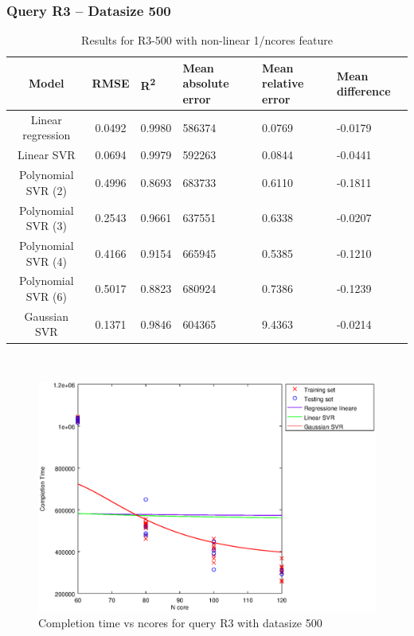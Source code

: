 \documentclass[a4paper,11pt]{article}
\begin{document}
\newpage
\subsubsection{Query R3 -- Datasize 500}
\begin{table}[H]
	\centering
	\begin{adjustbox}{center}
		\begin{tabular}{c | c M{1.2cm} M{2.5cm} M{2.5cm} M{1.8cm}}
			Model & RMSE & R\textsuperscript{2} & Mean absolute error & Mean relative error & Mean difference \tabularnewline
			\hline
			Linear regression & 0.0492 & 0.9980 & 586374 & 0.0769 & -0.0179 \\
			Linear SVR & 0.0694 & 0.9979 & 592263 & 0.0844 & -0.0441 \\
			Polynomial SVR (2) & 0.4996 & 0.8693 & 683733 & 0.6110 & -0.1811 \\
			Polynomial SVR (3) & 0.2543 & 0.9661 & 637551 & 0.6338 & -0.0207 \\
			Polynomial SVR (4) & 0.4166 & 0.9154 & 665945 & 0.5385 & -0.1210 \\
			Polynomial SVR (6) & 0.5017 & 0.8823 & 680924 & 0.7386 & -0.1239 \\
			Gaussian SVR & 0.1371 & 0.9846 & 604365 & 9.4363 & -0.0214 \\
		\end{tabular}
	\end{adjustbox}
	\\
	\caption{Results for R3-500 with non-linear 1/ncores feature}
	\label{table_R3_prediction_all}
\end{table}

\begin {figure}[hbtp]
\centering
\includegraphics[width=\textwidth]{output/R3_500_1_OVER_NCORES/plot_R3_500_bestmodels.eps}
\caption {Completion time vs ncores for query R3 with datasize 500}
\end {figure}
\end{document}
